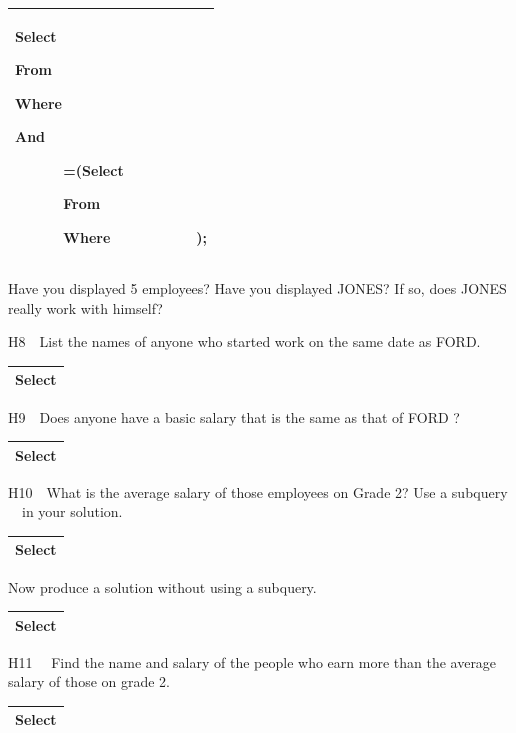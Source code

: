 \begin{flushleft}
\tablefirsthead{}
\tablehead{}
\tabletail{}
\tablelasttail{}
\begin{supertabular}{|m{14.551001cm}|}
\hline
Select

From

Where

And

\ \ \ \ \ \ =(Select

\ \ \ \ \ \   From

\ \ \ \ \ \   Where \ \ \ \ \ \ \ \ \ \ );\\\hline
\end{supertabular}
\end{flushleft}
Have you displayed 5 employees?  Have you displayed JONES?  If so, does JONES really work with himself?

H8\ \ List the names of anyone who started work on the same date as FORD.

\begin{flushleft}
\tablefirsthead{}
\tablehead{}
\tabletail{}
\tablelasttail{}
\begin{supertabular}{|m{14.551001cm}|}
\hline
Select

\\\hline
\end{supertabular}
\end{flushleft}
H9\ \ Does anyone have a basic salary that is the same as that of FORD ?

\begin{flushleft}
\tablefirsthead{}
\tablehead{}
\tabletail{}
\tablelasttail{}
\begin{supertabular}{|m{14.551001cm}|}
\hline
Select

\\\hline
\end{supertabular}
\end{flushleft}
H10\ \ What is the average salary of those employees on Grade 2?  Use a subquery \ \ in your solution.

\begin{flushleft}
\tablefirsthead{}
\tablehead{}
\tabletail{}
\tablelasttail{}
\begin{supertabular}{|m{14.551001cm}|}
\hline
Select

\\\hline
\end{supertabular}
\end{flushleft}
Now produce a solution without using a subquery.

\begin{flushleft}
\tablefirsthead{}
\tablehead{}
\tabletail{}
\tablelasttail{}
\begin{supertabular}{|m{14.551001cm}|}
\hline
Select

\\\hline
\end{supertabular}
\end{flushleft}
H11 \ \ Find the name and salary of the people who earn more than the average salary of those on grade 2.

\begin{flushleft}
\tablefirsthead{}
\tablehead{}
\tabletail{}
\tablelasttail{}
\begin{supertabular}{|m{14.551001cm}|}
\hline
Select

\\\hline
\end{supertabular}
\end{flushleft}

\clearpage
